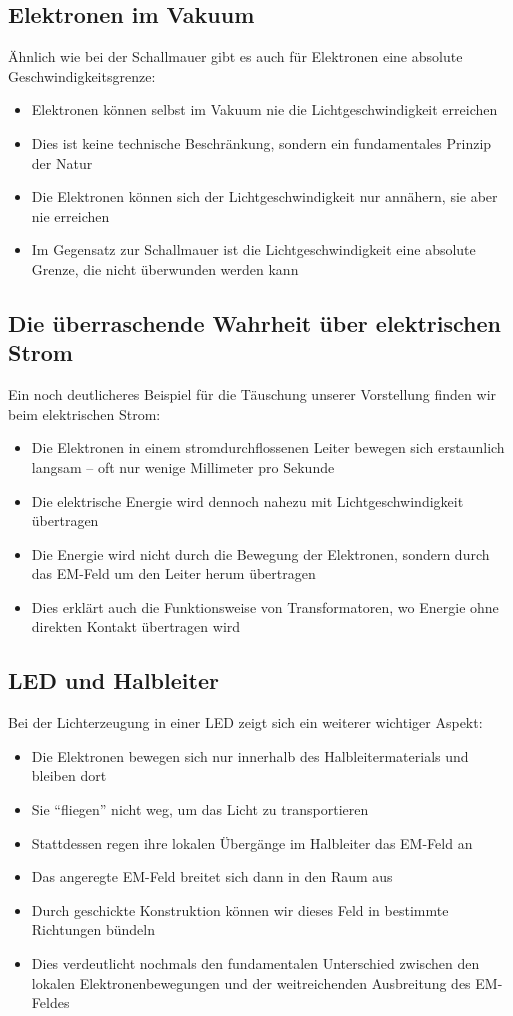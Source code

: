 \documentclass[12pt,a4paper]{article}
\begin{document}
	\subsection{Elektronen im Vakuum}
	Ähnlich wie bei der Schallmauer gibt es auch für Elektronen eine absolute Geschwindigkeitsgrenze:
	\begin{itemize}
		\item Elektronen können selbst im Vakuum nie die Lichtgeschwindigkeit erreichen
		\item Dies ist keine technische Beschränkung, sondern ein fundamentales Prinzip der Natur
		\item Die Elektronen können sich der Lichtgeschwindigkeit nur annähern, sie aber nie erreichen
		\item Im Gegensatz zur Schallmauer ist die Lichtgeschwindigkeit eine absolute Grenze, die nicht überwunden werden kann
	\end{itemize}
	
	\subsection{Die überraschende Wahrheit über elektrischen Strom}
	Ein noch deutlicheres Beispiel für die Täuschung unserer Vorstellung finden wir beim elektrischen Strom:
	\begin{itemize}
		\item Die Elektronen in einem stromdurchflossenen Leiter bewegen sich erstaunlich langsam -- oft nur wenige Millimeter pro Sekunde
		\item Die elektrische Energie wird dennoch nahezu mit Lichtgeschwindigkeit übertragen
		\item Die Energie wird nicht durch die Bewegung der Elektronen, sondern durch das EM-Feld um den Leiter herum übertragen
		\item Dies erklärt auch die Funktionsweise von Transformatoren, wo Energie ohne direkten Kontakt übertragen wird
	\end{itemize}
	
	\subsection{LED und Halbleiter}
	Bei der Lichterzeugung in einer LED zeigt sich ein weiterer wichtiger Aspekt:
	\begin{itemize}
		\item Die Elektronen bewegen sich nur innerhalb des Halbleitermaterials und bleiben dort
		\item Sie ``fliegen'' nicht weg, um das Licht zu transportieren
		\item Stattdessen regen ihre lokalen Übergänge im Halbleiter das EM-Feld an
		\item Das angeregte EM-Feld breitet sich dann in den Raum aus
		\item Durch geschickte Konstruktion können wir dieses Feld in bestimmte Richtungen bündeln
		\item Dies verdeutlicht nochmals den fundamentalen Unterschied zwischen den lokalen Elektronenbewegungen und der weitreichenden Ausbreitung des EM-Feldes
	\end{itemize}
	
\end{document}
